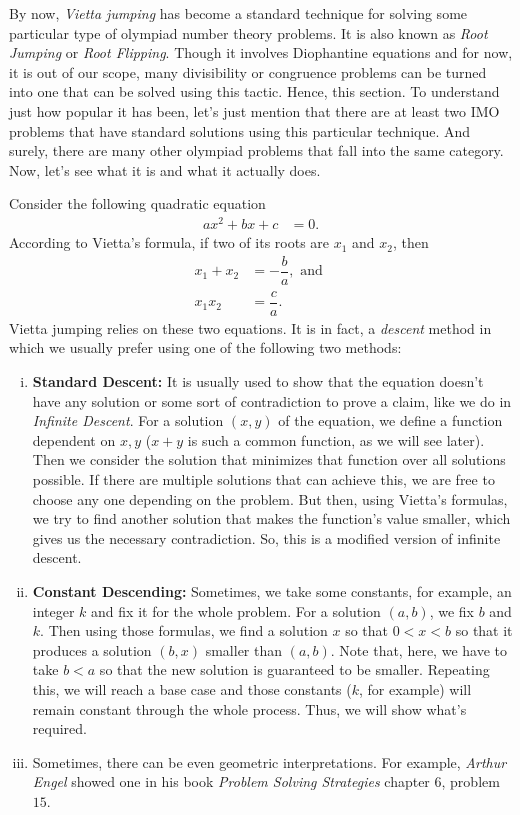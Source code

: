 \documentclass{subfile}
\begin{document}
	By now, \textit{Vietta jumping} has become a standard technique for solving some particular type of olympiad number theory problems. It is also known as \textit{Root Jumping} or \textit{Root Flipping}. Though it involves Diophantine equations and for now, it is out of our scope, many divisibility or congruence problems can be turned into one that can be solved using this tactic. Hence, this section.
	To understand just how popular it has been, let's just mention that there are at least two IMO problems that have standard solutions using this particular technique. And surely, there are many other olympiad problems that fall into the same category. Now, let's see what it is and what it actually does.
	
	Consider the following quadratic equation
		\begin{align*}
		 	ax^2+bx+c & = 0.
		\end{align*}
	According to Vietta's formula, if two of its roots are $x_1$ and $x_2$, then
		\begin{align*}
			x_1+x_2 & = -\dfrac{b}{a}, \text{ and }\\
			x_1x_2  & = \dfrac{c}{a}.
		\end{align*}
	Vietta jumping relies on these two equations. It is in fact, a \textit{descent} method in which we usually prefer using one of the following two methods:
		\begin{enumerate}[(i)]
			\item \textbf{Standard Descent:} It is usually used to show that the equation doesn't have any solution or some sort of contradiction to prove a claim, like we do in \textit{Infinite Descent}. For a solution $(x,y)$ of the equation, we define a function dependent on $x,y$ ($x+y$ is such a common function, as we will see later). Then we consider the solution that minimizes that function over all solutions possible. If there are multiple solutions that can achieve this, we are free to choose any one depending on the problem. But then, using Vietta's formulas, we try to find another solution that makes the function's value smaller, which gives us the necessary contradiction. So, this is a modified version of infinite descent.
			\item \textbf{Constant Descending:} Sometimes, we take some constants, for example, an integer $k$ and fix it for the whole problem. For a solution $(a,b)$, we fix $b$ and $k$. Then using those formulas, we find a solution $x$ so that $0<x<b$ so that it produces a solution $(b,x)$ smaller than $(a,b)$. Note that, here, we have to take $b<a$ so that the new solution is guaranteed to be smaller. Repeating this, we will reach a base case and those constants ($k$, for example) will remain constant through the whole process. Thus, we will show what's required.
			\item Sometimes, there can be even geometric interpretations. For example, \textit{Arthur Engel} showed one in his book \textit{Problem Solving Strategies} chapter $6$, problem $15$.
		\end{enumerate}
\end{document}
